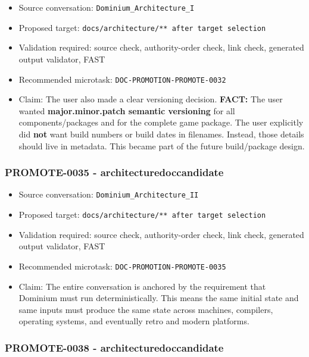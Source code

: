\documentclass[9pt,a4paper,openany]{book}
\begin{document}
\begin{itemize}
\item Source conversation: \texttt{Dominium\_\allowbreak{}Architecture\_\allowbreak{}I}
\item Proposed target: \texttt{docs/\allowbreak{}architecture/\allowbreak{}** after target selection}
\item Validation required: source check, authority-\allowbreak{}order check, link check, generated output validator, FAST
\item Recommended microtask: \texttt{DOC-\allowbreak{}PROMOTION-\allowbreak{}PROMOTE-\allowbreak{}0032}
\item Claim: The user also made a clear versioning decision.\allowbreak{} \textbf{FACT:} The user wanted \textbf{major.minor.patch semantic versioning} for all components/\allowbreak{}packages and for the complete game package.\allowbreak{} The user explicitly did \textbf{not} want build numbers or build dates in filenames.\allowbreak{} Instead, those details should live in metadata.\allowbreak{} This became part of the future build/\allowbreak{}package design.\allowbreak{}
\end{itemize}

\subsubsection{PROMOTE-0035 - architecturedoccandidate}

\begin{itemize}
\item Source conversation: \texttt{Dominium\_\allowbreak{}Architecture\_\allowbreak{}II}
\item Proposed target: \texttt{docs/\allowbreak{}architecture/\allowbreak{}** after target selection}
\item Validation required: source check, authority-\allowbreak{}order check, link check, generated output validator, FAST
\item Recommended microtask: \texttt{DOC-\allowbreak{}PROMOTION-\allowbreak{}PROMOTE-\allowbreak{}0035}
\item Claim: The entire conversation is anchored by the requirement that Dominium must run deterministically.\allowbreak{} This means the same initial state and same inputs must produce the same state across machines, compilers, operating systems, and eventually retro and modern platforms.\allowbreak{}
\end{itemize}

\subsubsection{PROMOTE-0038 - architecturedoccandidate}
\end{document}
